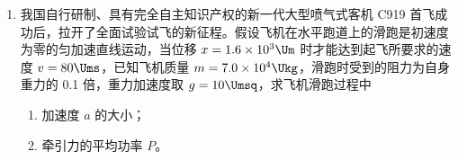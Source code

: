 \documentclass[\gkver]{gaokaozhenti}
\begin{document}
\begin{enumerate}
{（3）①若选用电源 $1.5\UV$，由于被测电阻很大，电路中电流非常小，不利于实验测量，则电源选用 $12\UV$ 的，即 F；则电压表就应该选取 B；电路中的最大电流为 $I = \frac{12}{10000}\UA = 1.2\UmA$，故选用电流表 C。

②因为给的滑动变阻器的最大阻值为 $10\UO$，若采用限流接法，则电路中电流和电压变化不明显，故采用滑动变阻器的分压接法；由于 $\frac{R_{V}}{R_{x}} < \frac{R_{x}}{R_{A}}$，所以采用电流表内接法，则设计电路图如图所示。


③由于电流表的分压作用，导致电压测量值偏大，而电流准确，由 $R_{x} = \frac{U}{I}$ 可知测量值偏大。
}

\item
我国自行研制、具有完全自主知识产权的新一代大型喷气式客机 C919 首飞成功后，拉开了全面试验试飞的新征程。假设飞机在水平跑道上的滑跑是初速度为零的匀加速直线运动，当位移 $x = 1.6 \times 10^{3}\Um$ 时才能达到起飞所要求的速度 $v = 80\Ums$，已知飞机质量 $m = 7.0 \times 10^{4}\Ukg$，滑跑时受到的阻力为自身重力的 0.1 倍，重力加速度取 $g = 10\Umsq$，求飞机滑跑过程中
\begin{enumerate}
	\item
	加速度 $a$ 的大小；
	\item
	牵引力的平均功率 $P$。
\end{enumerate}

\end{enumerate}
\end{document}
